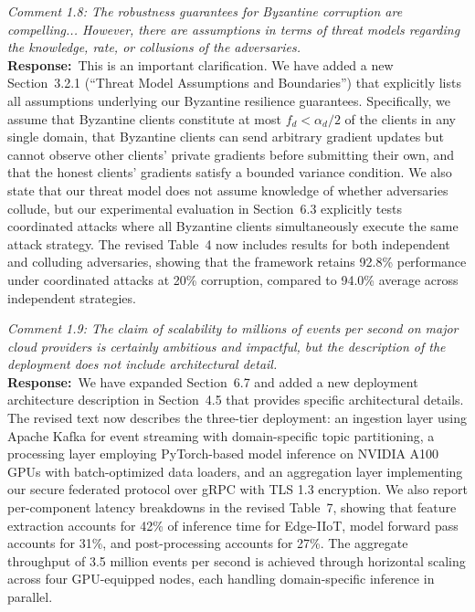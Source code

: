 \documentclass[12pt,a4paper]{article}
\newcommand{\RC}[1]{\noindent\textit{#1}\vspace{0.3em}\\}
\newcommand{\AR}{\noindent\textbf{Response:}~}
\begin{document}
\vspace{0.8em}

\RC{Comment 1.8: The robustness guarantees for Byzantine corruption are compelling... However, there are assumptions in terms of threat models regarding the knowledge, rate, or collusions of the adversaries.}

\AR This is an important clarification. We have added a new Section~3.2.1 (``Threat Model Assumptions and Boundaries'') that explicitly lists all assumptions underlying our Byzantine resilience guarantees. Specifically, we assume that Byzantine clients constitute at most $f_d < \alpha_d/2$ of the clients in any single domain, that Byzantine clients can send arbitrary gradient updates but cannot observe other clients' private gradients before submitting their own, and that the honest clients' gradients satisfy a bounded variance condition. We also state that our threat model does not assume knowledge of whether adversaries collude, but our experimental evaluation in Section~6.3 explicitly tests coordinated attacks where all Byzantine clients simultaneously execute the same attack strategy. The revised Table~4 now includes results for both independent and colluding adversaries, showing that the framework retains 92.8\% performance under coordinated attacks at 20\% corruption, compared to 94.0\% average across independent strategies.

\vspace{0.8em}

\RC{Comment 1.9: The claim of scalability to millions of events per second on major cloud providers is certainly ambitious and impactful, but the description of the deployment does not include architectural detail.}

\AR We have expanded Section~6.7 and added a new deployment architecture description in Section~4.5 that provides specific architectural details. The revised text now describes the three-tier deployment: an ingestion layer using Apache Kafka for event streaming with domain-specific topic partitioning, a processing layer employing PyTorch-based model inference on NVIDIA A100 GPUs with batch-optimized data loaders, and an aggregation layer implementing our secure federated protocol over gRPC with TLS 1.3 encryption. We also report per-component latency breakdowns in the revised Table~7, showing that feature extraction accounts for 42\% of inference time for Edge-IIoT, model forward pass accounts for 31\%, and post-processing accounts for 27\%. The aggregate throughput of 3.5 million events per second is achieved through horizontal scaling across four GPU-equipped nodes, each handling domain-specific inference in parallel.
\end{document}
